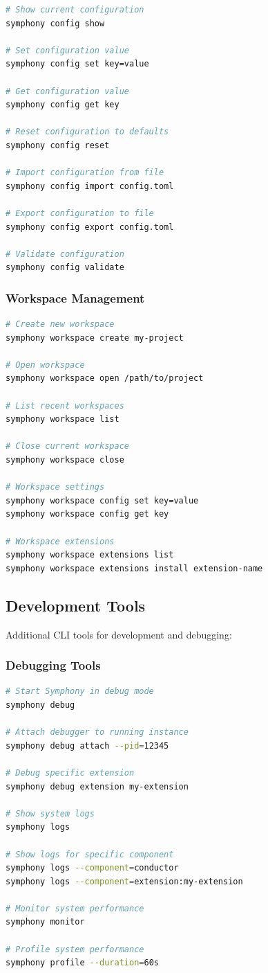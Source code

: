 \begin{lstlisting}[language=bash,caption={Configuration Management}]
# Show current configuration
symphony config show

# Set configuration value
symphony config set key=value

# Get configuration value
symphony config get key

# Reset configuration to defaults
symphony config reset

# Import configuration from file
symphony config import config.toml

# Export configuration to file
symphony config export config.toml

# Validate configuration
symphony config validate
\end{lstlisting}

\subsubsection*{Workspace Management}

\begin{lstlisting}[language=bash,caption={Workspace Management}]
# Create new workspace
symphony workspace create my-project

# Open workspace
symphony workspace open /path/to/project

# List recent workspaces
symphony workspace list

# Close current workspace
symphony workspace close

# Workspace settings
symphony workspace config set key=value
symphony workspace config get key

# Workspace extensions
symphony workspace extensions list
symphony workspace extensions install extension-name
\end{lstlisting}

\subsection*{Development Tools}

Additional CLI tools for development and debugging:

\subsubsection*{Debugging Tools}

\begin{lstlisting}[language=bash,caption={Debugging Commands}]
# Start Symphony in debug mode
symphony debug

# Attach debugger to running instance
symphony debug attach --pid=12345

# Debug specific extension
symphony debug extension my-extension

# Show system logs
symphony logs

# Show logs for specific component
symphony logs --component=conductor
symphony logs --component=extension:my-extension

# Monitor system performance
symphony monitor

# Profile system performance
symphony profile --duration=60s
\end{lstlisting}

